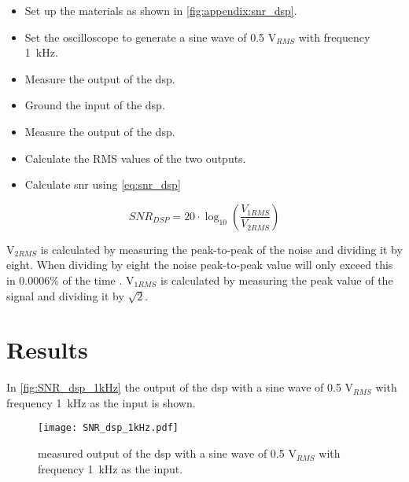\begin{itemize}
	\item Set up the materials as shown in \autoref{fig:appendix:snr_dsp}.
	\item Set the oscilloscope to generate a sine wave of 0.5 V$_{RMS}$ with frequency \SI{1}{\kilo\hertz}.
	\item Measure the output of the \gls{dsp}.
	\item Ground the input of the \gls{dsp}.
	\item Measure the output of the \gls{dsp}.
	\item Calculate the RMS values of the two outputs.
	\item Calculate \gls{snr} using \autoref{eq:snr_dsp}
\end{itemize}

\begin{equation}\label{eq:snr_dsp}
        SNR_{DSP} = 20 \cdot \log_{10}\left(\frac{V_{1RMS}}{V_{2RMS}}\right)
    \end{equation}
    
    \startexplain
    \stopexplain
    
V$_{2RMS}$ is calculated by measuring the peak-to-peak of the noise and dividing it by eight. When dividing by eight the noise peak-to-peak value will only exceed this in 0.0006\% of the time \citep{rms_noise}.
V$_{1RMS}$ is calculated by measuring the peak value of the signal and dividing it by $\sqrt{2}$. 

\section{Results}
In \autoref{fig:SNR_dsp_1kHz} the output of the \gls{dsp} with a sine wave of 0.5 V$_{RMS}$ with frequency \SI{1}{\kilo\hertz} as the input is shown. 

\begin{figure}[!h]
  \centering
  \texttt{[image: SNR\_dsp\_1kHz.pdf]}
  \caption{measured output of the \gls{dsp} with a sine wave of 0.5 V$_{RMS}$ with frequency \SI{1}{\kilo\hertz} as the input.}
  \label{fig:SNR_dsp_1kHz}
\end{figure}

